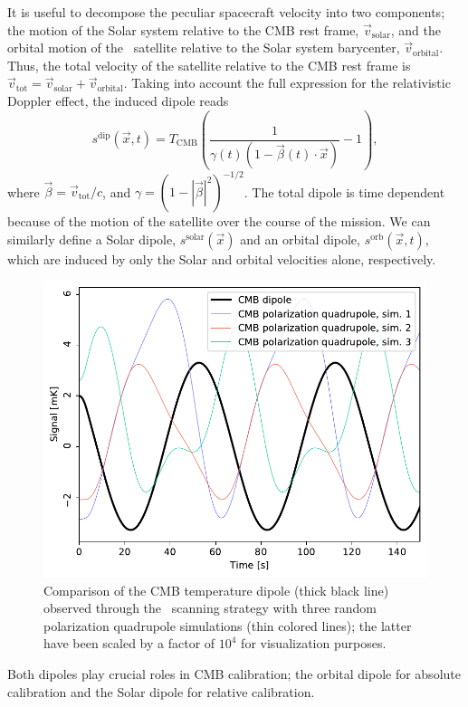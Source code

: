 \documentclass[twocolumn]{aa}
\renewcommand{\v}[0]{\vec{v}}
\begin{document}
It is useful to decompose the peculiar spacecraft velocity into two
components; the motion of the Solar system relative to the CMB
rest frame, $\vec{v}_{\mathrm{solar}}$, and the orbital motion of the
\Planck\ satellite relative to the Solar system barycenter,
$\vec{v}_{\mathrm{orbital}}$. Thus, the total velocity of the
satellite relative to the CMB rest frame is $\vec{v}_{\mathrm{tot}} =
\vec{v}_{\mathrm{solar}} + \vec{v}_{\mathrm{orbital}}$. Taking into
account the full expression for the relativistic Doppler effect, the
induced dipole reads
\begin{equation}
    s^{\mathrm{dip}}(\vec{x}, t) = T_{\mathrm{CMB}}\left(
    \frac{1}{\gamma(t)(1 - \vec{\beta}(t) \cdot \vec{x})} - 1 \right),
    \label{eq:dipole}
\end{equation}
where $\vec{\beta} = \v_{\mathrm{tot}}/c$, and $\gamma = (1-|\vec\beta|^2)^{-1/2}$. The total
dipole is time dependent because of the motion of the satellite over
the course of the mission. We can similarly define a Solar dipole,
$s^{\mathrm{solar}}(\vec{x})$ and an orbital dipole,
$s^{\mathrm{orb}}(\vec{x}, t)$, which are induced by only the Solar and
orbital velocities alone, respectively.
\begin{figure}[t]
  \center
  \includegraphics[width=\linewidth]{figs/dip_quadr_degeneracy.pdf}
    \caption{Comparison of the CMB temperature dipole (thick black
      line) observed through the \Planck\ scanning strategy with three
      random polarization quadrupole simulations (thin colored lines);
      the latter have been scaled by a factor of $10^{4}$ for
      visualization purposes. 
    }
  \label{fig:dip_quadr_degeneracy}
\end{figure}
Both dipoles play crucial roles in CMB calibration; the orbital dipole
for absolute calibration and the Solar dipole for relative
calibration.
\end{document}
